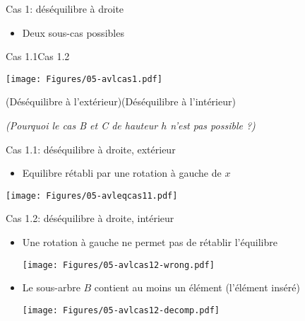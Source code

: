 \begin{frame}{Cas 1: déséquilibre à droite}
\begin{itemize}
\item Deux sous-cas possibles
\end{itemize}

\begin{center}
Cas 1.1\hspace{4cm}Cas 1.2

\medskip

\texttt{[image: Figures/05-avlcas1.pdf]}

\medskip
(Déséquilibre à l'extérieur)\hspace{1.3cm}(Déséquilibre à l'intérieur)
\end{center}

\bigskip

\emph{(Pourquoi le cas B et C de hauteur $h$ n'est pas possible ?)}

\end{frame}

\begin{frame}{Cas 1.1: déséquilibre à droite, extérieur}
\begin{itemize}
\item Equilibre rétabli par une rotation à gauche de $x$
\end{itemize}

\begin{center}
\texttt{[image: Figures/05-avleqcas11.pdf]}
\end{center}

\end{frame}

\begin{frame}{Cas 1.2: déséquilibre à droite, intérieur}
\begin{itemize}
\item Une rotation à gauche ne permet pas de rétablir l'équilibre

\begin{center}
\texttt{[image: Figures/05-avlcas12-wrong.pdf]}
\end{center}
\item Le sous-arbre $B$ contient au moins un élément (l'élément inséré)
\begin{center}
\texttt{[image: Figures/05-avlcas12-decomp.pdf]}
\end{center}

\end{itemize}

\end{frame}

